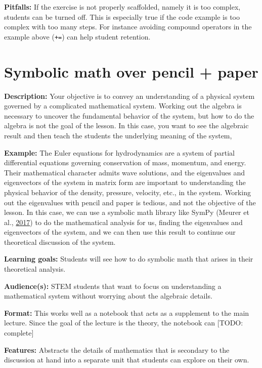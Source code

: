 \documentclass[]{book}
\begin{document}
\textbf{Pitfalls:} If the exercise is not properly scaffolded, namely it
is too complex, students can be turned off. This is especially true if
the code example is too complex with too many steps. For instance
avoiding compound operators in the example above (\texttt{+=}) can help
student retention.

\section{Symbolic math over pencil +
paper}\label{symbolic-math-over-pencil-paper}

\textbf{Description:} Your objective is to convey an understanding of a
physical system governed by a complicated mathematical system. Working
out the algebra is necessary to uncover the fundamental behavior of the
system, but how to do the algebra is not the goal of the lesson. In this
case, you want to see the algebraic result and then teach the students
the underlying meaning of the system,

\textbf{Example:} The Euler equations for hydrodynamics are a system of
partial differential equations governing conservation of mass, momentum,
and energy. Their mathematical character admits wave solutions, and the
eigenvalues and eigenvectors of the system in matrix form are important
to understanding the physical behavior of the density, pressure,
velocity, etc., in the system. Working out the eigenvalues with pencil
and paper is tedious, and not the objective of the lesson. In this case,
we can use a symbolic math library like SymPy (Meurer et al.,
\protect\hyperlink{ref-Meurer2017}{2017}) to do the mathematical
analysis for us, finding the eigenvalues and eigenvectors of the system,
and we can then use this result to continue our theoretical discussion
of the system.

\textbf{Learning goals:} Students will see how to do symbolic math that
arises in their theoretical analysis.

\textbf{Audience(s):} STEM students that want to focus on understanding
a mathematical system without worrying about the algebraic details.

\textbf{Format:} This works well as a notebook that acts as a supplement
to the main lecture. Since the goal of the lecture is the theory, the
notebook can {[}TODO: complete{]}

\textbf{Features:} Abstracts the details of mathematics that is
secondary to the discussion at hand into a separate unit that students
can explore on their own.
\end{document}
